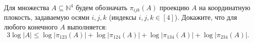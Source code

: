Для множества $A \subseteq \mathbb{N}^4$ будем обозначать $\pi_{ijk}(A)$ проекцию $A$ на координатную
плокость, задаваемую осями $i, j, k$ (индексы $i, j, k \in [4]$). Докажите, что для любого конечного $A$
выполняется:
$$
    3 \log |A| \le \log |\pi_{123}(A)| + \log |\pi_{124}(A)| + \log |\pi_{134}(A)| + \log |\pi_{234}(A)|.
$$

